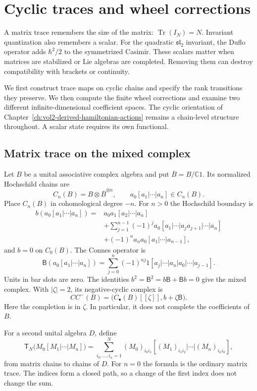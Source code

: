 \chapter{Cyclic traces and wheel corrections}
\label{chap:vol2-cyclic-traces-wheels}

A matrix trace remembers the size of the matrix:
$\operatorname{Tr}(I_N)=N$.
Invariant quantization also remembers a scalar. For the quadratic
$\mathfrak{sl}_2$ invariant, the Duflo operator adds
$\hbar^2/2$ to the symmetrized Casimir.
These scalars matter when matrices are stabilized or Lie algebras
are completed. Removing them can destroy compatibility with
brackets or continuity.

We first construct trace maps on cyclic chains and specify the
rank transitions they preserve. We then compute the finite wheel
corrections and examine two different infinite-dimensional
coefficient spaces. The cyclic orientation of
Chapter~\ref{ch:vol2-derived-hamiltonian-actions} remains a
chain-level structure throughout. A scalar state requires its own
functional.

\section{Matrix trace on the mixed complex}
\label{sec:vol2-matrix-mixed-trace}

Let $B$ be a unital associative complex algebra and put
$\overline B=B/\mathbb C1$.
Its normalized Hochschild chains are
\[
 C_n(B)=B\otimes\overline B^{\otimes n},
 \qquad a_0[a_1|\cdots|a_n]\in C_n(B).
\]
Place $C_n(B)$ in cohomological degree $-n$.
For $n>0$ the Hochschild boundary is
\begin{align*}
 b(a_0[a_1|\cdots|a_n])
 ={}&a_0a_1[a_2|\cdots|a_n]\\
 &+\sum_{j=1}^{n-1}(-1)^j
      a_0[a_1|\cdots|a_ja_{j+1}|\cdots|a_n]\\
 &+(-1)^na_na_0[a_1|\cdots|a_{n-1}],
\end{align*}
and $b=0$ on $C_0(B)$.
The Connes operator is
\[
 \mathsf B(a_0[a_1|\cdots|a_n])
 =\sum_{j=0}^n(-1)^{nj}
       1[a_j|\cdots|a_n|a_0|\cdots|a_{j-1}].
\]
Units in bar slots are zero. The identities
$b^2=\mathsf B^2=b\mathsf B+\mathsf Bb=0$ give the mixed
complex. With $|\zeta|=2$, its negative-cyclic complex is
\[
 CC^-(B)=\bigl(C_\bullet(B)[[\zeta]],b+\zeta\mathsf B\bigr).
\]
Here the completion is in $\zeta$. In particular, it does not
complete the coefficients of $B$.

For a second unital algebra $D$, define
\begin{equation}\label{eq:vol2-matrix-chain-trace}
 \mathsf T_N\bigl(M_0[M_1|\cdots|M_n]\bigr)
 =
 \sum_{i_0,\ldots,i_n=1}^N
 (M_0)_{i_0i_1}
 [(M_1)_{i_1i_2}|\cdots|(M_n)_{i_ni_0}],
\end{equation}
from matrix chains to chains of $D$.
For $n=0$ the formula is the ordinary matrix trace.
The indices form a closed path, so a change of the first index
does not change the sum.

